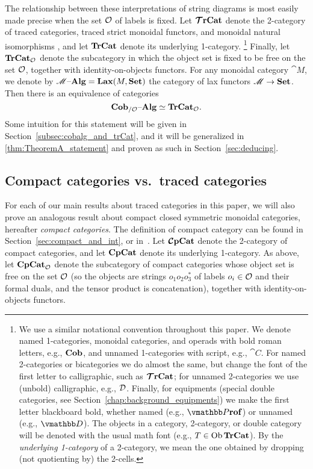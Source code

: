 \documentclass[11pt,oneside,article]{memoir}
\begin{document}
The relationship between these interpretations of string diagrams is most easily made precise when
the set $\mathcal{O}$ of labels is fixed. Let $\bm{\mathcal{T}}\mathbf{rCat}$ denote the 2-category of traced categories,
traced strict monoidal functors, and monoidal natural isomorphisms \cite{HK}, and let $\mathbf{TrCat}$
denote its underlying 1-category.%
\footnote{
   We use a similar notational convention throughout this paper. We denote named 1-categories,
   monoidal categories, and operads with bold roman letters, e.g., $\mathbf{Cob}$, and unnamed
   1-categories with script, e.g., $\cat{C}$. For named 2-categories or bicategories we do almost
   the same, but change the font of the first letter to calligraphic, such as $\bm{\mathcal{T}}\mathbf{rCat}$; for
   unnamed 2-categories we use (unbold) calligraphic, e.g., $\mathcal{D}$. Finally, for equipments
   (special double categories, see Section~\ref{chap:background_equipments}) we make the first letter
   blackboard bold, whether named (e.g., $\ndcat{P}{rof}$) or unnamed (e.g., $\dcat{D}$). The
   objects in a category, 2-category, or double category will be denoted with the usual math font
   (e.g., $T\in\operatorname{Ob}\mathbf{TrCat}$). By the \emph{underlying 1-category} of a 2-category, we mean the one obtained by dropping (not quotienting by) the 2-cells.}
Finally, let $\mathbf{TrCat}_{\mathcal{O}}$ denote the subcategory in which the object set is fixed to be free
on the set $\mathcal{O}$, together with identity-on-objects functors. For
any monoidal category $\cat{M}$, we denote by $\mathscr{M}{\text \textendash}\mathbf{Alg}=\mathbf{Lax}(M,\mathbf{Set})$ the category of lax
functors $\mathscr{M}\to\mathbf{Set}$. Then there is an equivalence of categories
\begin{equation}\label{eq:single_fiber_tr}
   \mathbf{Cob}_{/\mathcal{O}}{\text \textendash}\mathbf{Alg}\simeq\mathbf{TrCat}_{\mathcal{O}}.
\end{equation}
Some intuition for this statement will be given in Section~\ref{subsec:cobalg_and_trCat}, and it
will be generalized in \ref{thm:TheoremA_statement} and proven as such in Section~\ref{sec:deducing}.

\subsection{Compact categories vs.\ traced categories}

For each of our main results about traced categories in this paper, we will also prove an analogous
result about compact closed symmetric monoidal categories, hereafter \emph{compact categories}. The
definition of compact category can be found in Section~\ref{sec:compact_and_int}, or
in~\cite{MacL--CTWM}. Let $\bm{\mathcal{C}}\mathbf{pCat}$ denote the 2-category of compact categories, and let $\mathbf{CpCat}$
denote its underlying 1-category. As above, let $\mathbf{CpCat}_{\mathcal{O}}$ denote the subcategory of
compact categories whose object set is free on the set $\mathcal{O}$ (so the objects are strings
$o_1o_2o_3^*$ of labels $o_i\in\mathcal{O}$ and their formal duals, and the tensor product is
concatenation), together with identity-on-objects functors.
\end{document}
